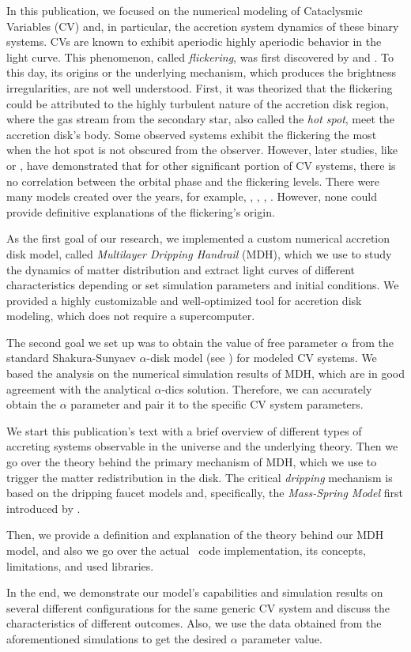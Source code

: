 In this publication, we focused on the numerical modeling of Cataclysmic Variables (CV) and, in particular, the accretion system dynamics of these binary systems. CVs are known to exhibit aperiodic highly aperiodic behavior in the light curve. This phenomenon, called \emph{flickering}, was first discovered by \citep{henize1949} and \citep{lenouvel1954}. To this day, its origins or the underlying mechanism, which produces the brightness irregularities, are not well understood. First, it was theorized that the flickering could be attributed to the highly turbulent nature of the accretion disk region, where the gas stream from the secondary star, also called the \emph{hot spot}, meet the accretion disk's body. Some observed systems exhibit the flickering the most when the hot spot is not obscured from the observer. However, later studies, like \citep{patterson1981} or \citep{wood1986}, have demonstrated that for other significant portion of CV systems, there is no correlation between the orbital phase and the flickering levels. There were many models created over the years, for example, \citep{dobrotka2012}, \citep{kley1997}, \citep{lyubarskii1997}, \citep{yonehara1997}. However, none could provide definitive explanations of the flickering's origin.  

As the first goal of our research, we implemented a custom numerical accretion disk model, called \emph{Multilayer Dripping Handrail} (MDH), which we use to study the dynamics of matter distribution and extract light curves of different characteristics depending or set simulation parameters and initial conditions. We provided a highly customizable and well-optimized tool for accretion disk modeling, which does not require a supercomputer. 

The second goal we set up was to obtain the value of free parameter $\alpha$ from the standard Shakura-Sunyaev $\alpha$-disk model (see \citep{shakura1973}) for modeled CV systems. We based the analysis on the numerical simulation results of MDH, which are in good agreement with the analytical $\alpha$-dics solution. Therefore, we can accurately obtain the $\alpha$ parameter and pair it to the specific CV system parameters. 

We start this publication's text with a brief overview of different types of accreting systems observable in the universe and the underlying theory. Then we go over the theory behind the primary mechanism of MDH, which we use to trigger the matter redistribution in the disk. The critical \emph{dripping} mechanism is based on the dripping faucet models and, specifically, the \emph{Mass-Spring Model} first introduced by \citep{shaw1984}. 

Then, we provide a definition and explanation of the theory behind our MDH model, and also we go over the actual \CC\ code implementation, its concepts, limitations, and used libraries. 

In the end, we demonstrate our model's capabilities and simulation results on several different configurations for the same generic CV system and discuss the characteristics of different outcomes. Also, we use the data obtained from the aforementioned simulations to get the desired $\alpha$ parameter value. 
